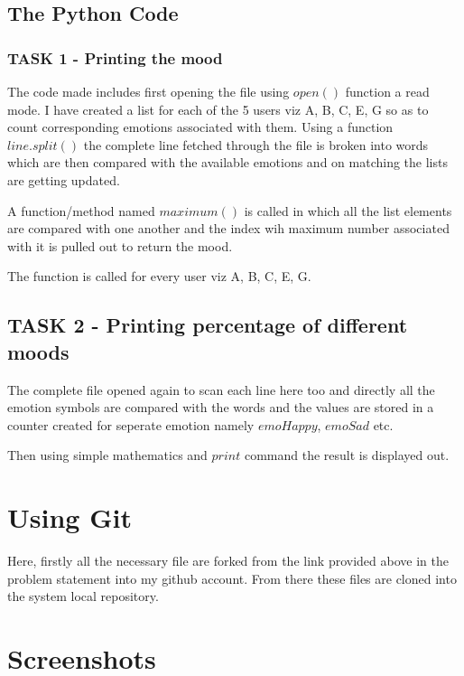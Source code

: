 \documentclass[a4paper,10pt]{article}
\begin{document}
\subsection{The Python Code}
\subsubsection{TASK 1 - Printing the mood}

The code made includes first opening the file using $open()$ function a read mode.
I have created a list for each of the 5 users viz A, B, C, E, G so as to count corresponding emotions associated with them.
Using a function $line.split()$ the complete line fetched through the file is broken into words which are then compared with the available emotions
and on matching the lists are getting updated.

A function/method named $maximum()$ is called in which all the list elements are compared with one another and the index wih maximum number associated 
with it is pulled out to return the mood.

The function is called for every user viz A, B, C, E, G.

\subsection{TASK 2 - Printing percentage of different moods}

The complete file opened again to scan each line here too and directly all the emotion symbols are compared with the words and the values
are stored in a counter created for seperate emotion namely $emoHappy$, $emoSad$ etc.

Then using simple mathematics and $print$ command the result is displayed out.

\section{Using Git}

Here, firstly all the necessary file are forked from the link provided above in the problem statement into my github account.
From there these files are cloned into the system local repository.

\newpage %
\section{Screenshots}
\end{document}
